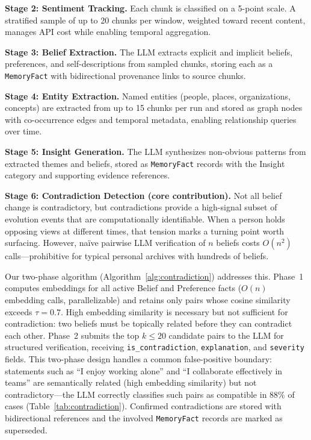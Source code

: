 \documentclass[conference]{IEEEtran}
\begin{document}
\textbf{Stage 2: Sentiment Tracking.} Each chunk is classified on a 5-point scale. A stratified sample of up to 20 chunks per window, weighted toward recent content, manages API cost while enabling temporal aggregation.

\textbf{Stage 3: Belief Extraction.} The LLM extracts explicit and implicit beliefs, preferences, and self-descriptions from sampled chunks, storing each as a \texttt{MemoryFact} with bidirectional provenance links to source chunks.

\textbf{Stage 4: Entity Extraction.} Named entities (people, places, organizations, concepts) are extracted from up to 15 chunks per run and stored as graph nodes with co-occurrence edges and temporal metadata, enabling relationship queries over time.

\textbf{Stage 5: Insight Generation.} The LLM synthesizes non-obvious patterns from extracted themes and beliefs, stored as \texttt{MemoryFact} records with the Insight category and supporting evidence references.

\textbf{Stage 6: Contradiction Detection (core contribution).}
Not all belief change is contradictory, but contradictions provide a high-signal subset of evolution events that are computationally identifiable. When a person holds opposing views at different times, that tension marks a turning point worth surfacing. However, na\"ive pairwise LLM verification of $n$ beliefs costs $O(n^2)$ calls---prohibitive for typical personal archives with hundreds of beliefs.

Our two-phase algorithm (Algorithm~\ref{alg:contradiction}) addresses this. Phase~1 computes embeddings for all active Belief and Preference facts ($O(n)$ embedding calls, parallelizable) and retains only pairs whose cosine similarity exceeds $\tau{=}0.7$. High embedding similarity is necessary but not sufficient for contradiction: two beliefs must be topically related before they can contradict each other. Phase~2 submits the top $k \leq 20$ candidate pairs to the LLM for structured verification, receiving \texttt{is\_contradiction}, \texttt{explanation}, and \texttt{severity} fields. This two-phase design handles a common false-positive boundary: statements such as ``I enjoy working alone'' and ``I collaborate effectively in teams'' are semantically related (high embedding similarity) but not contradictory---the LLM correctly classifies such pairs as compatible in 88\% of cases (Table~\ref{tab:contradiction}). Confirmed contradictions are stored with bidirectional references and the involved \texttt{MemoryFact} records are marked as superseded.
\end{document}

